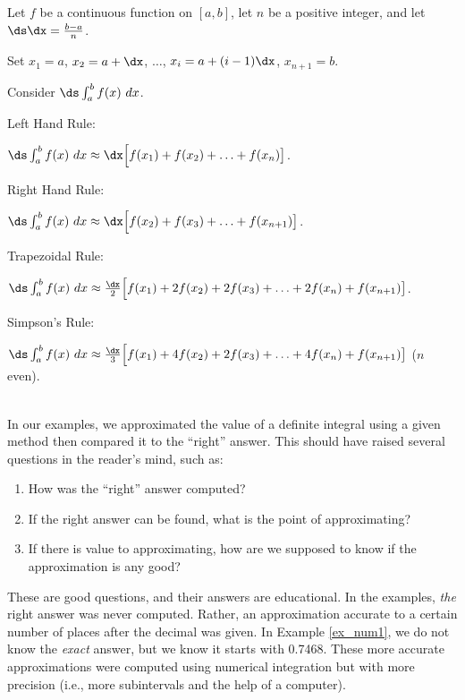 \setboxwidth{120pt}%
\noindent\ifthenelse{\isodd{\thepage}}{}{\hskip -120pt}%
\noindent\begin{minipage}{\specialboxlength}
{Let $f$ be a continuous function on $[a,b]$, let $n$ be a positive integer, and let $\ds\dx = \frac{b-a}{n}$. 

Set $x_1=a$, $x_2 = a+\dx$, $\ldots$, $x_i = a+(i-1)\dx$, $x_{n+1}=b$.

Consider $\ds\int_a^b f(x)\ dx$. 

\parbox{75pt}{Left Hand Rule:} $\ds\int_a^b f(x)\ dx \approx \dx\Big[f(x_1) + f(x_2) + \ldots + f(x_n)\big]$.\\

\parbox{75pt}{Right Hand Rule:} $\ds\int_a^b f(x)\ dx \approx \dx\Big[f(x_2) + f(x_3) + \ldots + f(x_{n+1})\big]$.\\

\parbox{75pt}{Trapezoidal Rule:} $\ds\int_a^b f(x)\ dx \approx \frac{\dx}2\Big[f(x_1) + 2f(x_2) + 2f(x_3) +\ldots + 2f(x_n)+ f(x_{n+1})\big]$.\\

\parbox{75pt}{Simpson's Rule:} $\ds\int_a^b f(x)\ dx \approx \frac{\dx}3\Big[f(x_1) + 4f(x_2) + 2f(x_3) +\ldots + 4f(x_n)+ f(x_{n+1})\big]$ {\small ($n$ even)}.
}
\end{minipage}
\restoreboxwidth\\

In our examples, we approximated the value of a definite integral using a given method then compared it to the ``right'' answer. This should have raised several questions in the reader's mind, such as:
\begin{enumerate}
\item		How was the ``right'' answer computed?
\item		If the right answer can be found, what is the point of approximating?
\item		If there is value to approximating, how are we supposed to know if the approximation is any good?
\end{enumerate}

These are good questions, and their answers are educational. In the examples, \textit{the} right answer was never computed. Rather, an approximation accurate to a certain number of places after the decimal was given. In Example \ref{ex_num1}, we do not know the \textit{exact} answer, but we know it starts with 0.7468. These more accurate approximations were computed using numerical integration but with more precision (i.e., more subintervals and the help of a computer). 

